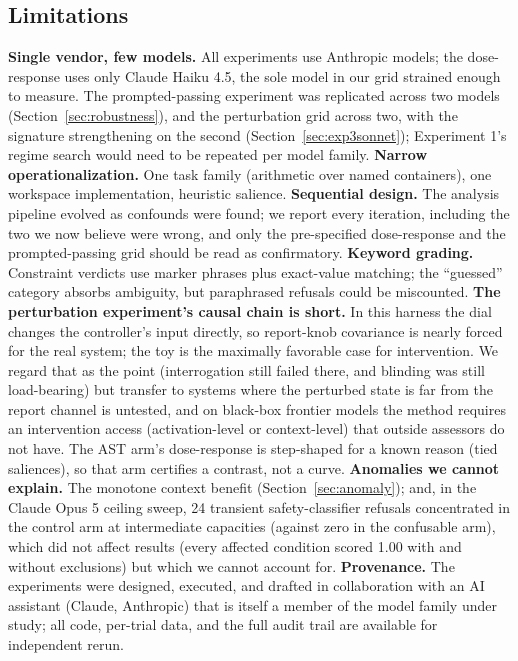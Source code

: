 \documentclass[11pt]{article}
\newcommand{\opus}{Claude Opus 5}
\newcommand{\haiku}{Claude Haiku 4.5}
\begin{document}
\subsection{Limitations}
\label{sec:limitations}

\textbf{Single vendor, few models.} All experiments use Anthropic models; the
dose-response uses only \haiku{}, the sole model in our grid strained enough to
measure. The prompted-passing experiment was replicated across two models
(Section~\ref{sec:robustness}), and the perturbation grid across
two, with the signature strengthening on the second
(Section~\ref{sec:exp3sonnet}); Experiment 1's regime search would need to be
repeated per model family. \textbf{Narrow operationalization.} One task family
(arithmetic over named containers), one workspace implementation, heuristic
salience. \textbf{Sequential design.} The analysis pipeline evolved as confounds
were found; we report every iteration, including the two we now believe were
wrong, and only the pre-specified dose-response and the prompted-passing grid
should be read as confirmatory. \textbf{Keyword grading.} Constraint verdicts
use marker phrases plus exact-value matching; the ``guessed'' category absorbs
ambiguity, but paraphrased refusals could be miscounted. \textbf{The perturbation experiment's
causal chain is short.} In this harness the dial changes the controller's
input directly, so report-knob covariance is nearly forced for the real
system; the toy is the maximally favorable case for intervention. We regard
that as the point (interrogation still failed there, and blinding was still
load-bearing) but transfer to systems where the perturbed state is far from
the report channel is untested, and on black-box frontier models the method
requires an intervention access (activation-level or context-level) that
outside assessors do not have. The AST arm's dose-response is step-shaped for
a known reason (tied saliences), so that arm certifies a contrast, not a
curve. \textbf{Anomalies we cannot explain.} The monotone context benefit (Section~\ref{sec:anomaly}); and,
in the \opus{} ceiling sweep, 24 transient safety-classifier refusals
concentrated in the control arm at intermediate capacities (against zero in the
confusable arm), which did not affect results (every affected condition scored
1.00 with and without exclusions) but which we cannot account for.
\textbf{Provenance.} The experiments were designed, executed, and drafted in
collaboration with an AI assistant (Claude, Anthropic) that is itself a member
of the model family under study; all code, per-trial data, and the full audit
trail are available for independent rerun.
\end{document}
